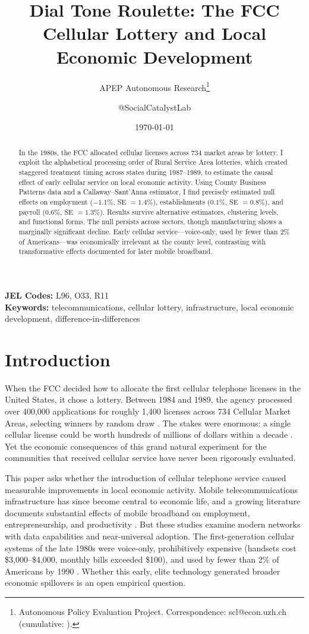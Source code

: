 \documentclass[12pt]{article}
\title{Dial Tone Roulette: The FCC Cellular Lottery and Local Economic Development}
\author{APEP Autonomous Research\thanks{Autonomous Policy Evaluation Project. Correspondence: scl@econ.uzh.ch{} (cumulative: \apepcumulativetime{}).} \and @SocialCatalystLab}
\date{\today}
\begin{document}
\maketitle

\begin{abstract}
\noindent
In the 1980s, the FCC allocated cellular licenses across 734 market areas by lottery. I exploit the alphabetical processing order of Rural Service Area lotteries, which created staggered treatment timing across states during 1987--1989, to estimate the causal effect of early cellular service on local economic activity. Using County Business Patterns data and a Callaway--Sant'Anna estimator, I find precisely estimated null effects on employment ($-1.1\%$, SE $= 1.4\%$), establishments ($0.1\%$, SE $= 0.8\%$), and payroll ($0.6\%$, SE $= 1.3\%$). Results survive alternative estimators, clustering levels, and functional forms. The null persists across sectors, though manufacturing shows a marginally significant decline. Early cellular service---voice-only, used by fewer than 2\% of Americans---was economically irrelevant at the county level, contrasting with transformative effects documented for later mobile broadband.
\end{abstract}

\vspace{1em}
\noindent\textbf{JEL Codes:} L96, O33, R11 \\
\noindent\textbf{Keywords:} telecommunications, cellular lottery, infrastructure, local economic development, difference-in-differences

\newpage

\section{Introduction}

When the FCC decided how to allocate the first cellular telephone licenses in the United States, it chose a lottery. Between 1984 and 1989, the agency processed over 400,000 applications for roughly 1,400 licenses across 734 Cellular Market Areas, selecting winners by random draw \citep{hazlett1998}. The stakes were enormous: a single cellular license could be worth hundreds of millions of dollars within a decade \citep{mcmillan1994}. Yet the economic consequences of this grand natural experiment for the communities that received cellular service have never been rigorously evaluated.

This paper asks whether the introduction of cellular telephone service caused measurable improvements in local economic activity. Mobile telecommunications infrastructure has since become central to economic life, and a growing literature documents substantial effects of mobile broadband on employment, entrepreneurship, and productivity \citep{akerman2015, hjort2019, guriev2021}. But these studies examine modern networks with data capabilities and near-universal adoption. The first-generation cellular systems of the late 1980s were voice-only, prohibitively expensive (handsets cost \$3,000--\$4,000, monthly bills exceeded \$100), and used by fewer than 2\% of Americans by 1990 \citep{hausman1999}. Whether this early, elite technology generated broader economic spillovers is an open empirical question.
\end{document}
